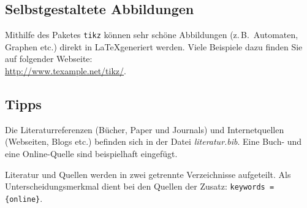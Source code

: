 \documentclass[12pt,a4paper,bibliography=totocnumbered,listof=totocnumbered]{scrartcl}
\begin{document}
\subsection{Selbstgestaltete Abbildungen}
Mithilfe des Paketes \texttt{tikz} können sehr schöne Abbildungen (z.\,B.\ Automaten, Graphen etc.) direkt in \LaTeX generiert werden. Viele Beispiele dazu finden Sie auf folgender Webseite:\\[1em]
\hspace*{3cm}\url{http://www.texample.net/tikz/}.

\subsection{Tipps}
Die Literaturreferenzen (Bücher, Paper und Journals) und Internetquellen (Webseiten, Blogs etc.) befinden sich in der Datei \textit{literatur.bib}. Eine Buch- und eine Online-Quelle sind beispielhaft eingefügt.  %

Literatur und Quellen werden in zwei getrennte Verzeichnisse aufgeteilt. Als Unterscheidungsmerkmal dient bei den Quellen der Zusatz: \texttt{keywords = \{online\}}.

\pagebreak


  



\end{document}
